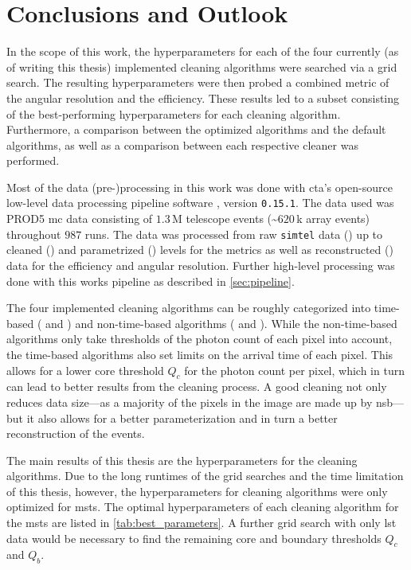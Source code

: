 \chapter{Conclusions and Outlook}
\label{ch:conclusions}

In the scope of this work, the hyperparameters for each of the four currently (as of writing this thesis)
implemented cleaning algorithms were searched via a grid search. The resulting hyperparameters were then
probed \wrt a combined metric of the angular resolution and the efficiency. These results led to a subset
consisting of the best-performing hyperparameters for each cleaning algorithm. Furthermore, a comparison between the
optimized algorithms and the default algorithms, as well as a comparison between each respective
cleaner was performed.

Most of the data (pre-)processing in this work was done with \gls{cta}'s open-source low-level data processing pipeline
software \ctapipe{}, version \texttt{0.15.1}. The data used was PROD5 \gls{mc} data consisting of
\(\num{1.3}\)\,M telescope events (\sim\(\num{620}\)\,k array events) throughout \(987\) runs. The data
was processed from raw \texttt{simtel} data (\rzero) up to cleaned (\dloa) and parametrized (\dlob) levels
for the metrics as well as reconstructed (\dlt) data for the efficiency and angular resolution.
Further high-level processing was done with this works pipeline as described in \autoref{sec:pipeline}.

The four implemented cleaning algorithms can be roughly categorized into time-based (\fact{} and \tcc) and non-time-based
algorithms (\tailcuts{} and \mars{}). While the non-time-based algorithms only take thresholds of the photon count of each pixel
into account, the time-based algorithms also set limits on the arrival time of each pixel. This allows
for a lower core threshold \(Q_c\) for the photon count per pixel, which in turn can lead to better
results from the cleaning process. A good cleaning not only reduces data size---as a majority of the
pixels in the image are made up by \gls{nsb}---but it also allows for a better parameterization and in turn
a better reconstruction of the events.

The main results of this thesis are the hyperparameters for the cleaning algorithms.
Due to the long runtimes of the grid searches and the time limitation of this thesis, however, the hyperparameters
for cleaning algorithms were only optimized for \glspl{mst}. The optimal hyperparameters of each cleaning algorithm for
the \glspl{mst} are listed in \autoref{tab:best_parameters}. A further grid search with only \gls{lst}
data would be necessary to find the remaining core and boundary thresholds \(Q_c\) and \(Q_b\).

